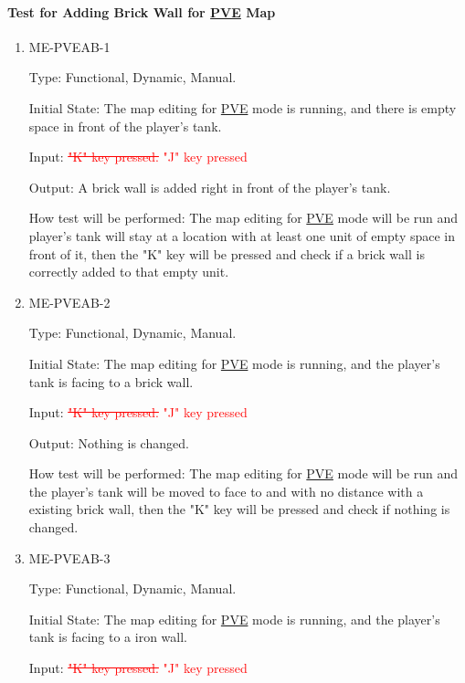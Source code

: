 \documentclass[12pt, titlepage]{article}
\begin{document}
\paragraph{Test for Adding Brick Wall for \underline{PVE} Map}

\begin{enumerate}

\item{ME-PVEAB-1\\}

Type: Functional, Dynamic, Manual.
					
Initial State: The map editing for \underline{PVE} mode is running, and there is empty space in front of the player's tank.
					
Input: \textcolor{red}{\sout{"K" key pressed.}} \textcolor{red}{"J" key pressed}
					
Output: A brick wall is added right in front of the player's tank.
					
How test will be performed: The map editing for \underline{PVE} mode will be run and player's tank will stay at a location with at least one unit of empty space in front of it, then the "K" key will be pressed and check if a brick wall is correctly added to that empty unit.
					
\item{ME-PVEAB-2\\}

Type: Functional, Dynamic, Manual.
					
Initial State: The map editing for \underline{PVE} mode is running, and the player's tank is facing to a brick wall.
					
Input: \textcolor{red}{\sout{"K" key pressed.}} \textcolor{red}{"J" key pressed}
					
Output: Nothing is changed.
					
How test will be performed: The map editing for \underline{PVE} mode will be run and the player's tank will be moved to face to and with no distance with a existing brick wall, then the "K" key will be pressed and check if nothing is changed.

\item{ME-PVEAB-3\\}

Type: Functional, Dynamic, Manual.
					
Initial State: The map editing for \underline{PVE} mode is running, and the player's tank is facing to a iron wall.
					
Input: \textcolor{red}{\sout{"K" key pressed.}} \textcolor{red}{"J" key pressed}
					

\end{enumerate}
\end{document}
